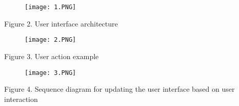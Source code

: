 \documentclass{article}
\begin{document}
\begin{figure}[h]
    \centering
    \texttt{[image: 1.PNG]}
    \label{fig: img_2}    
\end{figure}
\begin{center}{ Figure 2. User interface architecture}\end{center}



\begin{figure}[h]
    \centering
    \texttt{[image: 2.PNG]}
    \label{fig: img_3}
\end{figure}
\begin{center} Figure 3. User action example \end{center}

\newpage
\begin{figure}[t]
    \centering
     \texttt{[image: 3.PNG]}
    \label{fig: img_4}
\end{figure}
\begin{center}Figure 4. Sequence diagram for updating the user interface based on user interaction\\ \end{center}
\end{document}
